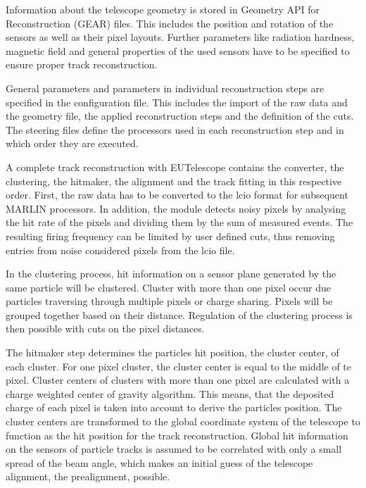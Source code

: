 Information about the telescope geometry is stored in  Geometry API for Reconstruction (GEAR) files. This includes the position and rotation
of the sensors as well as their pixel layouts. Further parameters like radiation hardness, magnetic field and general properties of the used sensors have to be
specified to ensure proper track reconstruction.

General parameters and parameters in individual reconstruction steps are specified in the configuration file. This includes the import of the raw data and the
geometry file, the applied reconstruction steps and the definition of the cuts. \\
The steering files define the processors used in each reconstruction step and in which order they are executed.

A complete track reconstruction with EUTelescope contains the converter, the clustering, the hitmaker, the alignment and the track fitting in this respective order.
First, the raw data has to be converted to the lcio format for subsequent MARLIN processors. In addition, the module detects noisy pixels by analysing the
hit rate of the pixels and dividing them by the sum of measured events. The resulting firing frequency can be limited by user defined cuts, thus removing entries
from noise considered pixels from the lcio file.

In the clustering process, hit information on a sensor plane generated by the same particle will be clustered. Cluster with more than one pixel occur due
particles traversing through multiple pixels or charge sharing. Pixels will be grouped together based on their distance.
Regulation of the clustering process is then possible with cuts on the pixel distances.

The hitmaker step determines the particles hit position, the cluster center, of each cluster. For one pixel cluster, the cluster center is equal to the middle of
te pixel. Cluster centers of clusters with more than one pixel are calculated with a charge weighted center of gravity algorithm. This means, that
the deposited charge of each pixel is taken into account to derive the particles position. The cluster centers are transformed to the global coordinate
system of the telescope to function as the hit position for the track reconstruction. Global hit information on the sensors of particle tracks is assumed to be correlated with only
a small spread of the beam angle, which makes an initial guess of the telescope alignment, the prealignment, possible. 
